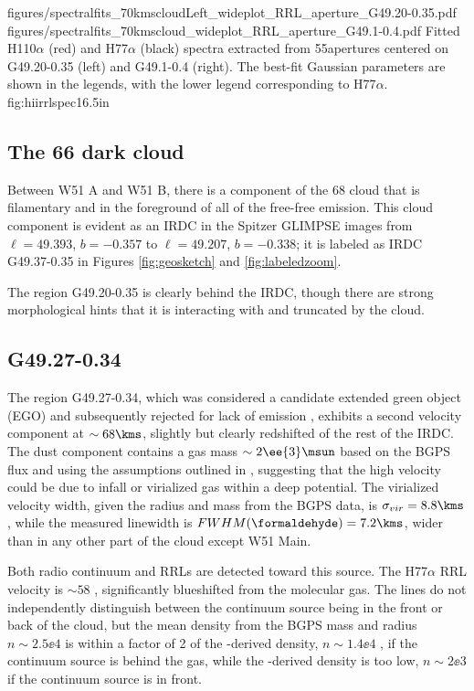 \FigureTwoAA
{figures/spectralfits_70kmscloudLeft_wideplot_RRL_aperture_G49.20-0.35.pdf}
{figures/spectralfits_70kmscloud_wideplot_RRL_aperture_G49.1-0.4.pdf}
{Fitted H110$\alpha$ (red) and H77$\alpha$ (black) spectra extracted from
55\arcsec apertures centered on G49.20-0.35 (left) and G49.1-0.4 (right).
The best-fit Gaussian parameters are shown in the legends, with the lower
legend corresponding to H77$\alpha$.}
{fig:hiirrlspec}{1}{6.5in}

\subsection{The 66  \um dark cloud}
Between W51 A and W51 B, there is a component of the 68 \kms cloud that is
filamentary and in the foreground of all of the free-free emission.
This cloud component is evident as an IRDC in the Spitzer GLIMPSE images from
$\ell=49.393$, $b=-0.357$ to $\ell=49.207$, $b=-0.338$; it is labeled as IRDC
G49.37-0.35 in Figures \ref{fig:geosketch} and \ref{fig:labeledzoom}.

The \hii region G49.20-0.35 is clearly behind the IRDC, though there are strong
morphological hints that it is interacting with and truncated by the cloud.

\subsection{G49.27-0.34}
The \uchii region G49.27-0.34, which was considered a candidate extended green
object (EGO) and subsequently rejected for lack of \hh emission
\citep{De-Buizer2010a,Lee2013a}, exhibits a second velocity component at $\sim68
\kms$, slightly but clearly redshifted of the rest of the IRDC.  The dust
component contains a gas mass $\sim2\ee{3} \msun$ based on the BGPS flux and
using the assumptions
outlined in \citet{Aguirre2011a}, suggesting that the high velocity could be
due to infall or virialized gas within a deep potential.  The virialized
velocity width, given the radius and mass from the BGPS data, is
$\sigma_{vir}=8.8 \kms$, while the measured \formaldehyde linewidth is
$FWHM(\formaldehyde) = 7.2 \kms$, wider than in any other part of the cloud
except W51 Main.

Both radio continuum and RRLs are detected toward this source.  The H77$\alpha$
RRL velocity is $\sim58$ \kms, significantly blueshifted from the molecular
gas.  The \formaldehyde lines do not independently distinguish between the
continuum source being in the front or back of the cloud, but the mean density
from the BGPS mass and radius $n\sim2.5\ee{4}$ \percc is within a factor of 2
of the \formaldehyde-derived density, $n\sim1.4\ee{4}$ \percc, if the continuum
source is behind the gas, while the \formaldehyde-derived density is too low,
$n\sim2\ee{3}$ \percc if the continuum source is in front.

